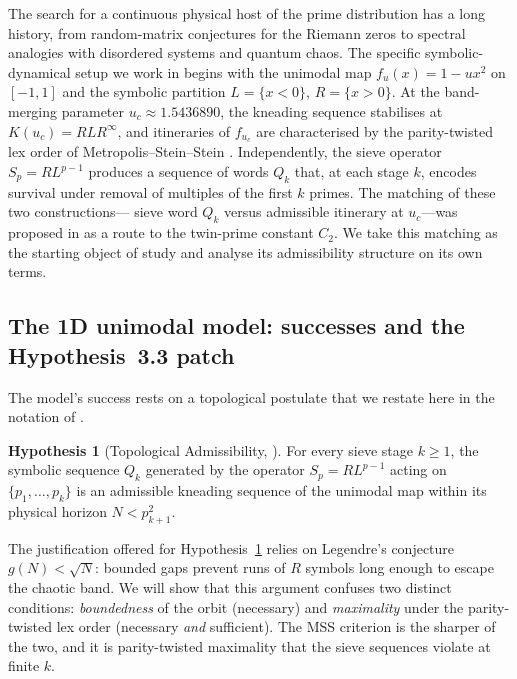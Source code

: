 \documentclass[11pt,a4paper]{article}
\theoremstyle{definition}
\newtheorem{hypothesis}{Hypothesis}
\begin{document}
The search for a continuous physical host of the prime distribution
has a long history, from random-matrix conjectures for the Riemann
zeros to spectral analogies with disordered systems and quantum chaos.
The specific symbolic-dynamical setup we work in begins with the
unimodal map $f_u(x) = 1 - u x^2$ on $[-1, 1]$ and the symbolic
partition $L = \{x < 0\}$, $R = \{x > 0\}$. At the band-merging
parameter $u_c \approx 1.5436890$, the kneading sequence stabilises at
$K(u_c) = RLR^\infty$, and itineraries of $f_{u_c}$ are characterised
by the parity-twisted lex order of Metropolis--Stein--Stein
\cite{metropolis1973finite,milnor1988iterated}. Independently, the
sieve operator $S_p = R L^{p-1}$ produces a sequence of words $Q_k$
that, at each stage $k$, encodes survival under removal of multiples
of the first $k$ primes. The matching of these two constructions---
sieve word $Q_k$ versus admissible itinerary at $u_c$---was proposed
in \cite{wang2026emergence} as a route to the twin-prime constant
$C_2$. We take this matching as the starting object of study and
analyse its admissibility structure on its own terms.

\subsection{The 1D unimodal model: successes and the Hypothesis~3.3 patch}

The model's success rests on a topological postulate that we restate
here in the notation of \cite{wang2026emergence}.

\begin{hypothesis}[Topological Admissibility, \cite{wang2026emergence}]
\label{hyp:33}
For every sieve stage $k \geq 1$, the symbolic sequence $Q_k$ generated
by the operator $S_p = R L^{p-1}$ acting on $\{p_1, \ldots, p_k\}$ is an
admissible kneading sequence of the unimodal map within its physical
horizon $N < p_{k+1}^2$.
\end{hypothesis}

The justification offered for Hypothesis~\ref{hyp:33} relies on
Legendre's conjecture $g(N) < \sqrt{N}$: bounded gaps prevent runs of
$R$ symbols long enough to escape the chaotic band. We will show that
this argument confuses two distinct conditions: \emph{boundedness} of
the orbit (necessary) and \emph{maximality} under the parity-twisted
lex order (necessary \emph{and} sufficient). The MSS criterion is the
sharper of the two, and it is parity-twisted maximality that the sieve
sequences violate at finite $k$.
\end{document}
